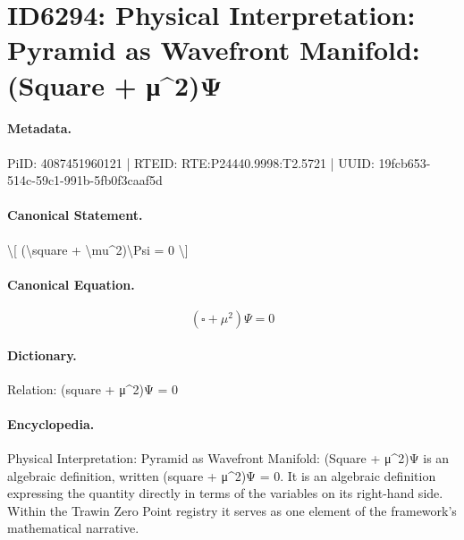 \section*{ID6294: Physical Interpretation: Pyramid as Wavefront Manifold: (Square + μ\textasciicircum{}2)Ψ}
\paragraph{Metadata.}
PiID: 4087451960121 | RTEID: RTE:P24440.9998:T2.5721 | UUID: 19fcb653-514c-59c1-991b-5fb0f3caaf5d

\paragraph{Canonical Statement.}
\textbackslash{}[ (\textbackslash{}square + \textbackslash{}mu\textasciicircum{}2)\textbackslash{}Psi = 0 \textbackslash{}]

\paragraph{Canonical Equation.}
\[
(\square + \mu^2)\Psi = 0
\]

\paragraph{Dictionary.}
Relation: (square + μ\textasciicircum{}2)Ψ = 0

\paragraph{Encyclopedia.}
Physical Interpretation: Pyramid as Wavefront Manifold: (Square + μ\textasciicircum{}2)Ψ is an algebraic definition, written (square + μ\textasciicircum{}2)Ψ = 0. It is an algebraic definition expressing the quantity directly in terms of the variables on its right-hand side. Within the Trawin Zero Point registry it serves as one element of the framework's mathematical narrative.
